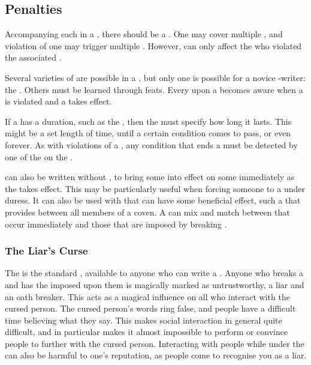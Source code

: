 \subsection{Penalties}

Accompanying each {\stipulation} in a {\contract}, there should be a {\contractpenalty}.
One {\contractpenalty} may cover multiple {\stipulations}, and violation of one {\stipulation} may trigger multiple {\penalties}.
However, {\penalties} can only affect the {\signatories} who violated the associated {\stipulations}.

Several varieties of {\contractpenalty} are possible in a {\contract}, but only one is possible for a novice {\contract}-writer: the {\liarscurse}.
Others must be learned through feats.
Every {\signatory} upon a {\contract} becomes aware when a {\stipulation} is violated and a {\contractpenalty} takes effect.

If a {\contractpenalty} has a duration, such as the {\liarscurse}, then the {\contract} must specify how long it lasts.
This might be a set length of time, until a certain condition comes to pass, or even forever.
As with violations of a {\stipulation}, any condition that ends a {\contractpenalty} must be detected by one of the {\signatories} on the {\contract}.

\capital{\contracts} can also be written without {\stipulations}, to bring some {\penalties} into effect on some {\signatories} immediately as the {\contract} takes effect.
This may be particularly useful when forcing someone to {\sign} a {\contract} under duress.
It can also be used with {\penalties} that can have some beneficial effect, such a {\contract} that provides  between all members of a coven.
A {\contract} can mix and match between {\penalties} that occur immediately and those that are imposed by breaking {\stipulations}.

\subsubsection{The Liar's Curse}

The {\liarscurse} is the standard {\contractpenalty}, available to anyone who can write a {\contract}.
Anyone who breaks a {\contract} and has the {\liarscurse} imposed upon them is magically marked as untrustworthy, a liar and an oath breaker.
This acts as a magical influence on all who interact with the cursed person.
The cursed person's words ring false, and people have a difficult time believing what they say.
This makes social interaction in general quite difficult, and in particular makes it almost impossible to perform  or convince people to {\sign} further {\contracts} with the cursed person.
Interacting with people while under the {\liarscurse} can also be harmful to one's reputation, as people come to recognise you as a liar.

